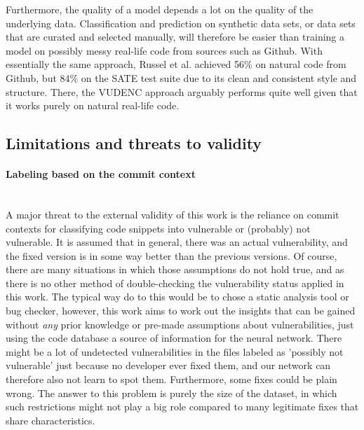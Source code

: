 \documentclass[
a4paper,
pagesize,
pdftex,
12pt,
twoside, %
BCOR=5mm, %
ngerman,
fleqn,
final,
]{scrartcl}
\begin{document}
	Furthermore, the quality of a model depends a lot on the quality of the underlying data. Classification and prediction on synthetic data sets, or data sets that are curated and selected manually, will therefore be easier than training a model on possibly messy real-life code from sources such as Github. With essentially the same approach, Russel et al. achieved 56\% on natural code from Github, but 84\% on the SATE test suite due to its clean and consistent style and structure. There, the VUDENC approach arguably performs quite well given that it works purely on natural real-life code. 
	
	
	\subsection{Limitations and threats to validity}
	
	\paragraph{Labeling based on the commit context}\mbox{}\\
	A major threat to the external validity of this work is the reliance on commit contexts for classifying code snippets into vulnerable or (probably) not vulnerable. It is assumed that in general, there was an actual vulnerability, and the fixed version is in some way better than the previous versions. Of course, there are many situations in which those assumptions do not hold true, and as there is no other method of double-checking the vulnerability status applied in this work. The typical way do to this would be to chose a static analysis tool or bug checker, however, this work aims to work out the insights that can be gained without \textit{any} prior knowledge or pre-made assumptions about vulnerabilities, just using the code database a source of information for the neural network. There might be a lot of undetected vulnerabilities in the files labeled as 'possibly not vulnerable' just because no developer ever fixed them, and our network can therefore also not learn to spot them. Furthermore, some fixes could be plain wrong. The answer to this problem is purely the size of the dataset, in which such restrictions might not play a big role compared to many legitimate fixes that share characteristics.
\end{document}
